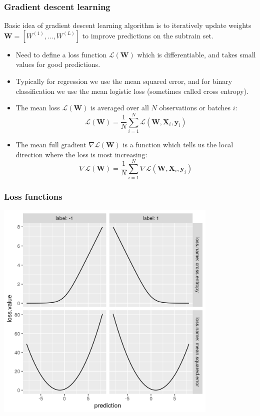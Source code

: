 \documentclass{beamer}
\begin{document}
\begin{frame}
  \frametitle{Gradient descent learning}
  Basic idea of gradient descent learning algorithm is to iteratively
  update weights $\mathbf W = [W^{(1)}, \dots, W^{(L)} ]$ to improve
  predictions on the subtrain set.
  \begin{itemize}
  \item Need to define a loss function
    $\mathcal L(\mathbf W)$ which is differentiable, and
    takes small values for good predictions.
  \item Typically for regression we use the mean squared error, and
    for binary classification we use the mean logistic
    loss (sometimes called cross entropy).
  \item The mean loss $\mathcal L(\mathbf W)$ is averaged over all $N$
    observations or batches $i$:
    $$
    \mathcal L(\mathbf W) =
    \frac 1 N \sum_{i=1}^N
    \mathcal L(\mathbf W, \mathbf X_i, \mathbf y_i)
    $$
  \item The mean full gradient $\nabla \mathcal L(\mathbf W)$ is a function
    which tells us the local direction where the loss is most
    increasing:
    $$
    \nabla \mathcal L(\mathbf W) =
    \frac 1 N \sum_{i=1}^N
    \nabla \mathcal L(\mathbf W, \mathbf X_i, \mathbf y_i)
    $$
  \end{itemize}
\end{frame}

\begin{frame}
  \frametitle{Loss functions}
  \includegraphics[width=0.8\textwidth]{figure-loss} 
\end{frame}
\end{document}
